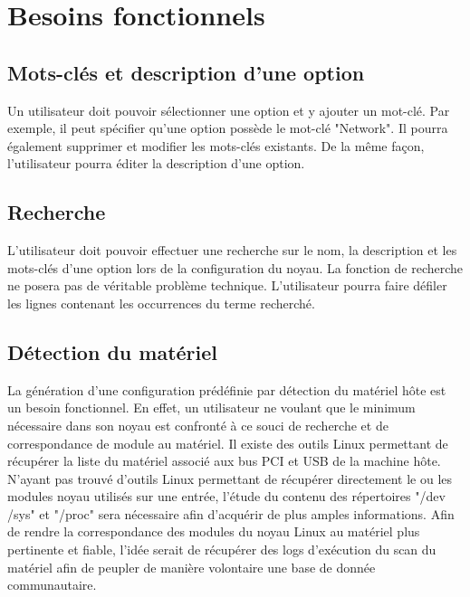 \documentclass[16pts]{report}
\begin{document}

\nocite{*}

\chapter{Besoins fonctionnels}
\label{cha:Besoins fonctionnels}


\section{Mots-clés et description d'une option}
\label{sec:Mots-clés et description d'une option}

Un utilisateur doit pouvoir sélectionner une option et y ajouter un mot-clé.
Par exemple, il peut spécifier qu'une option possède le mot-clé "Network". Il
pourra également supprimer et modifier les mots-clés existants. De la même
façon, l'utilisateur pourra éditer la description d'une option.

\section{Recherche}
\label{sec:Recherche}

L'utilisateur doit pouvoir effectuer une recherche sur le nom, la description
et les mots-clés d'une option lors de la configuration du noyau. La fonction de
recherche ne posera pas de véritable problème technique. L'utilisateur pourra
faire défiler les lignes contenant les occurrences du terme recherché.

\section{Détection du matériel}
\label{sec:Détection du matériel}

La génération d'une configuration prédéfinie par détection du matériel hôte est
un besoin fonctionnel. En effet, un utilisateur ne voulant que le minimum
nécessaire dans son noyau est confronté à ce souci de recherche et de
correspondance de module au matériel.
Il existe des outils Linux permettant de récupérer la liste du matériel associé
aux bus PCI et USB de la machine hôte.
N'ayant pas trouvé d'outils Linux permettant de récupérer directement le ou les
modules noyau utilisés sur une entrée, l'étude du contenu des répertoires "/dev
/sys" et "/proc" sera nécessaire afin d'acquérir de plus amples informations.
Afin de rendre la correspondance des modules du noyau Linux au matériel plus
pertinente et fiable, l'idée serait de récupérer des logs d'exécution du scan
du matériel afin de peupler de manière volontaire une base de donnée
communautaire.
\end{document}
